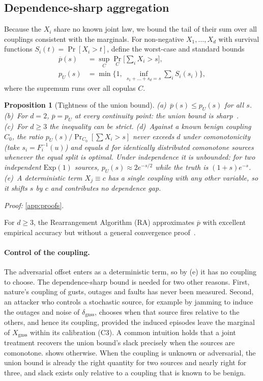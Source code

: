 \documentclass[letterpaper,twocolumn,10pt]{article}
\newcommand{\dgnss}{\delta_{\mathrm{gnss}}}
\newcommand{\pbar}{\overline{p}}
\newtheorem{proposition}{Proposition}
\theoremstyle{remark}
\begin{document}
\subsection{Dependence-sharp aggregation}
Because the $X_i$ share no known joint law, we bound the tail of their sum over
all couplings consistent with the marginals. For non-negative $X_1,\dots,X_d$
with survival functions $S_i(t)=\Pr[X_i>t]$, define the worst-case and standard bounds
\begin{align}
\pbar(s)&=\sup_{C}\Pr_C\Big[\textstyle\sum_{i}X_i>s\Big],\\
p_U(s)&=\min\Big\{1,\ \inf_{s_1+\dots+s_d=s}\textstyle\sum_iS_i(s_i)\Big\},
\end{align}
where the supremum runs over all copulas $C$.

\begin{proposition}[Tightness of the union bound]
\label{prop:union}
(a)~$\pbar(s)\le p_U(s)$ for all $s$.
(b)~For $d=2$, $\pbar=p_U$ at every continuity point: the union bound is
sharp~\cite{makarov1981,ruschendorf1982,frank1987}.
(c)~For $d\ge3$ the inequality can be strict.
(d)~Against a known benign coupling $C_0$, the ratio
$p_U(s)/\Pr_{C_0}[\sum X_i>s]$ never exceeds $d$ under comonotonicity (take
$s_i=F_i^{-1}(u)$) and equals $d$ for identically distributed comonotone sources
whenever the equal split is optimal. Under independence it is unbounded: for two independent
$\mathrm{Exp}(1)$ sources, $p_U(s)\approx2e^{-s/2}$ while the truth is
$(1+s)e^{-s}$.
(e)~A deterministic term $X_j\equiv c$ has a single coupling with any other
variable, so it shifts $s$ by $c$ and contributes no dependence gap.
\end{proposition}
\noindent\emph{Proof:} \cref{app:proofs}.

\noindent
For $d\ge3$, the Rearrangement Algorithm (RA) approximates $\pbar$ with
excellent empirical accuracy but without a general convergence
proof~\cite{puccetti2012,embrechts2013var}.

\paragraph{Control of the coupling.}
The adversarial offset enters as a deterministic term, so by (e) it has no
coupling to choose. The dependence-sharp bound is needed for two other
reasons. First, nature's coupling of gusts, outages and faults has never been
measured. Second, an attacker who controls a stochastic source, for
example by jamming to induce the outages and noise of $\dgnss$, chooses when
that source fires relative to the others, and hence its coupling, provided the
induced episodes leave the marginal of $X_{\mathrm{gnss}}$ within its
calibration (C3). A common intuition holds that a joint treatment recovers the
union bound's slack precisely when the sources are comonotone.
 shows otherwise.
When the coupling is unknown or adversarial, the union bound is already the
right quantity for two sources and nearly right for three, and slack exists
only relative to a coupling that is known to be benign.
\end{document}
